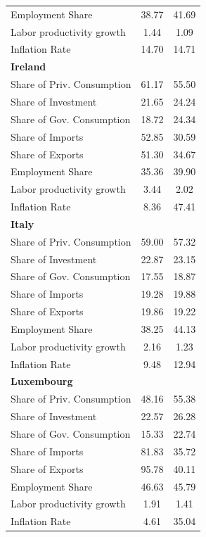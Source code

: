 \documentclass[12pt]{article}
\begin{document}
\begin{appendices}
\begin{center}
\begin{longtable}{lcc}
Employment Share &     38.77 &     41.69 \\  
Labor productivity growth &      1.44 &      1.09 \\  
Inflation Rate &     14.70 &     14.71 \\    \hline
\textbf{Ireland} &  &  \\  
Share of Priv. Consumption &     61.17 &     55.50 \\  
Share of Investment &     21.65 &     24.24 \\  
Share of Gov. Consumption &     18.72 &     24.34 \\  
Share of Imports &     52.85 &     30.59 \\  
Share of Exports &     51.30 &     34.67 \\  
Employment Share &     35.36 &     39.90 \\  
Labor productivity growth &      3.44 &      2.02 \\  
Inflation Rate &      8.36 &     47.41 \\   \hline
\textbf{Italy} &  &  \\  
Share of Priv. Consumption &     59.00 &     57.32 \\  
Share of Investment &     22.87 &     23.15 \\  
Share of Gov. Consumption &     17.55 &     18.87 \\  
Share of Imports &     19.28 &     19.88 \\  
Share of Exports &     19.86 &     19.22 \\  
Employment Share &     38.25 &     44.13 \\  
Labor productivity growth &      2.16 &      1.23 \\  
Inflation Rate &      9.48 &     12.94 \\  \hline
\textbf{Luxembourg} &  &  \\  
Share of Priv. Consumption &     48.16 &     55.38 \\  
Share of Investment &     22.57 &     26.28 \\  
Share of Gov. Consumption &     15.33 &     22.74 \\  
Share of Imports &     81.83 &     35.72 \\  
Share of Exports &     95.78 &     40.11 \\  
Employment Share &     46.63 &     45.79 \\  
Labor productivity growth &      1.91 &      1.41 \\  
Inflation Rate &      4.61 &     35.04 \\  \hline

\end{longtable}
\end{center}
\end{appendices}
\end{document}
